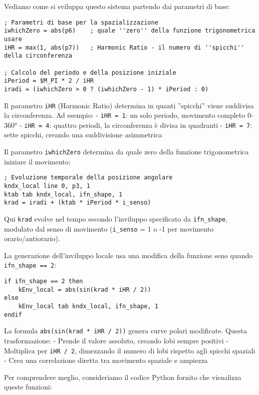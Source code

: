 Vediamo come si sviluppa questo sistema partendo dai parametri di base:

\begin{lstlisting}[language=Csound]
; Parametri di base per la spazializzazione
iwhichZero = abs(p6)    ; quale ''zero'' della funzione trigonometrica usare
iHR = max(1, abs(p7))   ; Harmonic Ratio - il numero di ''spicchi'' della circonferenza

; Calcolo del periodo e della posizione iniziale
iPeriod = $M_PI * 2 / iHR
iradi = (iwhichZero > 0 ? (iwhichZero - 1) * iPeriod : 0)
\end{lstlisting}

Il parametro \texttt{iHR} (Harmonic Ratio) determina in quanti ''spicchi'' viene suddivisa la circonferenza. Ad esempio:
- \texttt{iHR = 1}: un solo periodo, movimento completo 0-360°
- \texttt{iHR = 4}: quattro periodi, la circonferenza è divisa in quadranti
- \texttt{iHR = 7}: sette spicchi, creando una suddivisione asimmetrica

Il parametro \texttt{iwhichZero} determina da quale zero della funzione trigonometrica iniziare il movimento:

\begin{lstlisting}[language=Csound]
; Evoluzione temporale della posizione angolare
kndx_local line 0, p3, 1
ktab tab kndx_local, ifn_shape, 1
krad = iradi + (ktab * iPeriod * i_senso)
\end{lstlisting}

Qui \texttt{krad} evolve nel tempo secondo l'inviluppo specificato da \texttt{ifn\_shape}, modulato dal senso di movimento (\texttt{i\_senso} = 1 o -1 per movimento orario/antiorario).

La generazione dell'inviluppo locale usa una modifica della funzione seno quando \texttt{ifn\_shape == 2}:

\begin{lstlisting}[language=Csound]
if ifn_shape == 2 then
    kEnv_local = abs(sin(krad * iHR / 2))
else
    kEnv_local tab kndx_local, ifn_shape, 1
endif
\end{lstlisting}

La formula \texttt{abs(sin(krad * iHR / 2))} genera curve polari modificate. Questa trasformazione:
- Prende il valore assoluto, creando lobi sempre positivi
- Moltiplica per \texttt{iHR / 2}, dimezzando il numero di lobi rispetto agli spicchi spaziali
- Crea una correlazione diretta tra movimento spaziale e ampiezza

Per comprendere meglio, consideriamo il codice Python fornito che visualizza queste funzioni:

